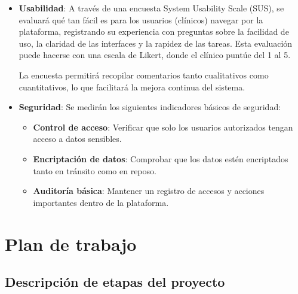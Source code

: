 \documentclass{article}
\begin{document}
\begin{itemize}[leftmargin=1.2em]
\begin{itemize}[leftmargin=1.2em]
    \item \textbf{Cobertura de los códigos (HPO, ORPHA, CIE-11)}: La cobertura de los códigos se medirá verificando si los códigos de enfermedades raras, como HPO, ORPHA y ICD-11, están siendo utilizados correctamente en las entradas de los pacientes y si se cumplen con los estándares internacionales. Esto se puede medir mediante la comparación de los registros ingresados con las bases de datos de estos sistemas de codificación. Se realizarán pruebas para asegurar que los códigos correctos se asocian a las condiciones de salud adecuadas, mejorando la precisión de la plataforma.
  \end{itemize}

  \item \textbf{Usabilidad}: A través de una encuesta System Usability Scale (SUS), se evaluará qué tan fácil es para los usuarios (clínicos) navegar por la plataforma, registrando su experiencia con preguntas sobre la facilidad de uso, la claridad de las interfaces y la rapidez de las tareas. Esta evaluación puede hacerse con una escala de Likert, donde el clínico puntúe del 1 al 5.

La encuesta permitirá recopilar comentarios tanto cualitativos como cuantitativos, lo que facilitará la mejora continua del sistema. 

  \item \textbf{Seguridad}: Se medirán los siguientes indicadores básicos de seguridad:

  \begin{itemize}[leftmargin=1.2em]
    \item \textbf{Control de acceso}: Verificar que solo los usuarios autorizados tengan acceso a datos sensibles.
    \item \textbf{Encriptación de datos}: Comprobar que los datos estén encriptados tanto en tránsito como en reposo.
    \item \textbf{Auditoría básica}: Mantener un registro de accesos y acciones importantes dentro de la plataforma.
  \end{itemize}


\end{itemize}




\section{Plan de trabajo}

\subsection{Descripción de etapas del proyecto}
\end{document}
